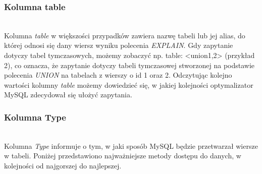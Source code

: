 \subsubsection{Kolumna table}\leavevmode\\
Kolumna \textit{table} w większości przypadków zawiera nazwę tabeli lub jej alias, do której odnosi się dany wiersz wyniku polecenia \textit{EXPLAIN}. Gdy zapytanie dotyczy tabel tymczasowych, możemy zobaczyć np. table: <union1,2> (przykład 2), co oznacza, że zapytanie dotyczy tabeli tymczasowej stworzonej na podstawie polecenia \textit{UNION} na tabelach z wierszy o id 1 oraz 2.
Odczytując kolejno wartości kolumny \textit{table} możemy dowiedzieć się, w jakiej kolejności optymalizator MySQL zdecydował się ułożyć zapytania. 

\subsubsection{Kolumna Type}\leavevmode\\
Kolumna \textit{Type} informuje o tym, w jaki sposób MySQL będzie przetwarzał wiersze w tabeli. Poniżej przedstawiono najważniejsze metody dostępu do danych, w kolejności od najgorszej do najlepszej.

